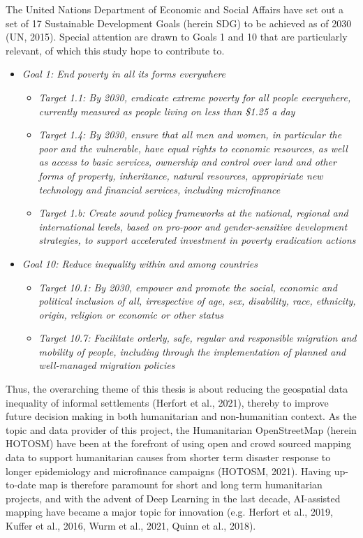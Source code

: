 \documentclass[11pt, a4paper, twoside]{report}
\begin{document}
The United Nations Department of Economic and Social Affairs have set out a set of 17 Sustainable Development Goals (herein SDG) to be achieved as of 2030 (UN, 2015). Special attention are drawn to Goals 1 and 10 that are particularly relevant, of which this study hope to contribute to.\\\par

\begin{itemize}
  \item \textit{Goal 1: End poverty in all its forms everywhere}
  \begin{itemize}
    \item \textit{Target 1.1: By 2030, eradicate extreme poverty for all people everywhere, currently measured as people living on less than \$1.25 a day}
    \item \textit{Target 1.4: By 2030, ensure that all men and women, in particular the poor and the vulnerable, have equal rights to economic resources, as well as access to basic services, ownership and control over land and other forms of property, inheritance, natural resources, appropiriate new technology and financial services, including microfinance}
    \item \textit{Target 1.b: Create sound policy frameworks at the national, regional and international levels, based on pro-poor and gender-sensitive development strategies, to support accelerated investment in poverty eradication actions}
  \end{itemize}
  \item \textit{Goal 10: Reduce inequality within and among countries}
  \begin{itemize}
    \item \textit{Target 10.1: By 2030, empower and promote the social, economic and political inclusion of all, irrespective of age, sex, disability, race, ethnicity, origin, religion or economic or other status}
    \item \textit{Target 10.7: Facilitate orderly, safe, regular and responsible migration and mobility of people, including through the implementation of planned and well-managed migration policies}
  \end{itemize}
\end{itemize}
\newline

Thus, the overarching theme of this thesis is about reducing the geospatial data inequality of informal settlements (Herfort et al., 2021), thereby to improve future decision making in both humanitarian and non-humanitian context. As the topic and data provider of this project, the Humanitarian OpenStreetMap (herein HOTOSM) have been at the forefront of using open and crowd sourced mapping data to support humanitarian causes from shorter term disaster response to longer epidemiology and microfinance campaigns (HOTOSM, 2021). Having up-to-date map is therefore paramount for short and long term humanitarian projects, and with the advent of Deep Learning in the last decade, AI-assisted mapping have became a major topic for innovation (e.g. Herfort et al., 2019, Kuffer et al., 2016, Wurm et al., 2021, Quinn et al., 2018).\\\par
\end{document}
